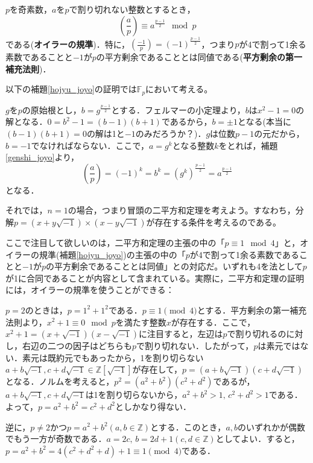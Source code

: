 \begin{lemma}\label{hojyu_joyo}
    $p$を奇素数，$a$を$p$で割り切れない整数とするとき，
    \begin{equation*}
        \left(\frac{a}{p}\right)\equiv a^{\frac{p-1}{2}}\mod{p}
    \end{equation*}
    である(\textbf{オイラーの規準})．特に，$\left(\frac{-1}{p}\right)=(-1)^{\frac{p-1}{2}}$，つまり$p$が4で割って1余る素数であることと$-1$が$p$の平方剰余であることとは同値である(\textbf{平方剰余の第一補充法則})．
\end{lemma}

以下の補題\ref{hojyu_joyo}の証明では$\mathds{F}_p$において考える。

\begin{prf}
    $g$を$p$の原始根とし，$b=g^{\frac{p-1}{2}}$とする．フェルマーの小定理より，$b$は$x^2-1=0$の解となる．$0=b^2-1=(b-1)(b+1)$であるから，$b=\pm 1$となる(本当に$(b-1)(b+1)=0$の解は1と$-1$のみだろうか？)．$g$は位数$p-1$の元だから，$b=-1$でなければならない．ここで，$a=g^k$となる整数$k$をとれば，補題\ref{genshi_joyo}より，\[
    \left(\frac{a}{p}\right)=(-1)^k=b^k=(g^k)^{\frac{p-1}{2}}=a^{\frac{p-1}{2}}
    \]
    となる．
\end{prf}

それでは，$n=1$の場合，つまり冒頭の二平方和定理を考えよう。すなわち，分解$p=(x+y\sqrt{-1})\times(x-y\sqrt{-1})$が存在する条件を考えるのである。

ここで注目して欲しいのは，二平方和定理の主張の中の「$p\equiv 1\mod{4}$」と，オイラーの規準(補題\ref{hojyu_joyo})の主張の中の「$p$が4で割って1余る素数であることと$-1$が$p$の平方剰余であることとは同値」との対応だ。いずれも4を法として$p$が1に合同であることが内容として含まれている。実際に，二平方和定理の証明には，オイラーの規準を使うことができる：

\begin{prf}
    $p=2$のときは，$p=1^2+1^2$である．$p\equiv 1\pmod{4}$とする．平方剰余の第一補充法則より，$x^2+1\equiv 0\mod{p}$を満たす整数$x$が存在する．ここで，$x^2+1=(x+\sqrt{-1})(x-\sqrt{-1})$に注目すると，左辺は$p$で割り切れるのに対し，右辺の二つの因子はどちらも$p$で割り切れない．したがって，$p$は素元ではない．素元は既約元でもあったから，1を割り切らない$a+b\sqrt{-1}, c+d\sqrt{-1}\in\mathds{Z}[\sqrt{-1}]$が存在して，$p=(a+b\sqrt{-1})(c+d\sqrt{-1})$となる．ノルムを考えると，$p^2=(a^2+b^2)(c^2+d^2)$であるが，$a+b\sqrt{-1}, c+d\sqrt{-1}$は1を割り切らないから，$a^2+b^2>1,\, c^2+d^2>1$である．よって，$p=a^2+b^2=c^2+d^2$としかなり得ない．

    逆に，$p\ne 2$かつ$p=a^2+b^2\left(a,b\in\mathds{Z}\right)$とする．このとき，$a, b$のいずれかが偶数でもう一方が奇数である．$a=2c,\, b=2d+1\left(c, d\in\mathds{Z}\right)$としてよい．すると，$p=a^2+b^2=4(c^2+d^2+d)+1\equiv 1\pmod{4}$である．
\end{prf}

